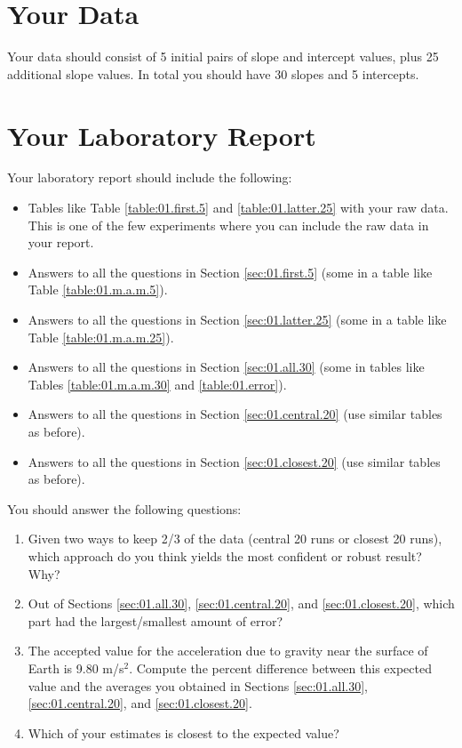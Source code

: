 \section{Your Data}
Your data should consist of 5 initial pairs of slope and intercept values, plus 25 additional slope values. In total you should have 30 slopes and 5 intercepts.
\newpage
\section{Your Laboratory Report}
Your laboratory report should include the following:
\begin{itemize}
    \item Tables like Table \ref{table:01.first.5} and \ref{table:01.latter.25} with your raw data. This is one of the few experiments where you can include the raw data in your report.
    \item Answers to all the questions in Section \ref{sec:01.first.5} (some in a table like Table \ref{table:01.m.a.m.5}).
    \item Answers to all the questions in Section \ref{sec:01.latter.25} (some in a table like Table \ref{table:01.m.a.m.25}).
    \item Answers to all the questions in Section \ref{sec:01.all.30} (some in tables like Tables \ref{table:01.m.a.m.30} and \ref{table:01.error}).
    \item Answers to all the questions in Section \ref{sec:01.central.20} (use similar tables as before).
    \item Answers to all the questions in Section \ref{sec:01.closest.20} (use similar tables as before).
\end{itemize}
You should answer the following questions:
\begin{enumerate}
    \item Given two ways to keep 2/3 of the data (central 20 runs or closest 20 runs), which approach do you think yields the most confident or robust result? Why?
    \item Out of Sections \ref{sec:01.all.30}, \ref{sec:01.central.20}, and \ref{sec:01.closest.20}, which part had the largest/smallest amount of error?
    \item The accepted value for the acceleration due to gravity near the surface of Earth is 9.80 m/s$^{2}$. Compute the percent difference between this expected value and the averages you obtained in Sections \ref{sec:01.all.30}, \ref{sec:01.central.20}, and \ref{sec:01.closest.20}.
    \item Which of your estimates is closest to the expected value?
\end{enumerate}
\FloatBarrier
\newpage
